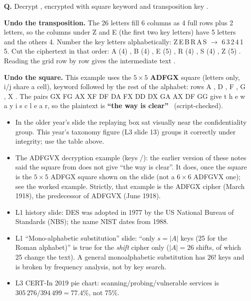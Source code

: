 \begin{worked}
\textbf{Q.} Decrypt , encrypted with square keyword  and transposition key .

\textbf{Undo the transposition.} The 26 letters fill 6 columns as 4 full rows plus 2 letters, so the columns under Z and E (the first two key letters) have 5 letters and the others 4. Number the key letters alphabetically: Z\,E\,B\,R\,A\,S $\to$ 6\,3\,2\,4\,1\,5. Cut the ciphertext in that order: A (4) , B (4) , E (5) , R (4) , S (4) , Z (5) . Reading the grid row by row gives the intermediate text .

\textbf{Undo the square.} This example uses the $5 \times 5$ \textbf{ADFGX} square (letters only, i/j share a cell), keyword  followed by the rest of the alphabet: rows A , D , F , G , X . The pairs GX FG AX XF DF DA FX DD DX GA AX DF GG give t h e w a y i s c l e a r, so the plaintext is \textbf{``the way is clear''} \checkmark\ (script-checked).
\end{worked}

\begin{fixbox}
\begin{itemize}
  \item In the older year's slide the replaying box sat visually near the confidentiality group. This year's taxonomy figure (L3 slide 13) groups it correctly under integrity; use the table above.
  \item The ADFGVX decryption example (keys /): the earlier version of these notes said the square from  does not give ``the way is clear''. It does, once the square is the $5 \times 5$ ADFGX square shown on the slide (not a $6 \times 6$ ADFGVX one); see the worked example. Strictly, that example is the ADFGX cipher (March 1918), the predecessor of ADFGVX (June 1918).
  \item L1 history slide: DES was adopted in 1977 by the US National Bureau of Standards (NBS); the name NIST dates from 1988.
  \item L1 ``Mono-alphabetic substitution'' slide: ``only $s = |A|$ keys (25 for the Roman alphabet)'' is true for the \emph{shift} cipher only ($|A| = 26$ shifts, of which 25 change the text). A general monoalphabetic substitution has $26!$ keys and is broken by frequency analysis, not by key search.
  \item L3 CERT-In 2019 pie chart: scanning/probing/vulnerable services is $305\,276 / 394\,499 = 77.4\%$, not 75\%.
\end{itemize}
\end{fixbox}
